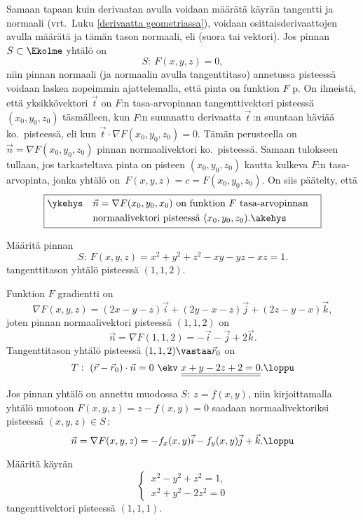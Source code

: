 Samaan tapaan kuin derivaatan avulla voidaan määrätä käyrän tangentti ja normaali 
(vrt.\ Luku \ref{derivaatta geometriassa}), voidaan osittaisderivaattojen avulla määrätä 
 ja tämän tason normaali, eli 
(suora tai vektori). Jos pinnan $S\subset\Ekolme$ yhtälö on 
\[ 
S: \ F(x,y,z)=0, 
\]
niin pinnan normaali (ja normaalin avulla tangenttitaso) annetussa pisteessä voidaan laskea 
nopeimmin ajattelemalla, että pinta on funktion $F$ p. On ilmeistä,
että yksikkövektori $\vec t$ on $F$:n tasa-arvopinnan tangenttivektori pisteessä
$(x_0,y_0,z_0)$ täsmälleen, kun $F$:n suunnattu derivaatta $\vec t\,$:n suuntaan häviää ko.\
pisteessä, eli kun $\vec t \cdot \nabla F(x_0,y_0,z_0)=0$. Tämän perusteella on
$\vec n = \nabla F(x_0,y_0,z_0)$ pinnan normaalivektori ko.\ pisteessä. Samaan tulokseen
tullaan, jos tarkasteltava pinta on pisteen $(x_0,y_0,z_0)$ kautta kulkeva $F$:n
tasa-arvopinta, jonka yhtälö on $\,F(x,y,z) = c = F(x_0,y_0,z_0)$. On siis päätelty, että
\[ \boxed{ \begin{aligned}
           \ykehys\quad &\vec n = \nabla F(x_0,y_0,x_0)\ 
                            \text{on funktion}\ F\ \text{tasa-arvopinnan} \quad \\
                        &\text{normaalivektori pisteessä}\ (x_0,y_0,z_0). \akehys
           \end{aligned} } 
\]
\begin{Exa} Määritä pinnan
\[ 
S:\ F(x,y,z) = x^2+y^2+z^2-xy-yz-xz = 1. 
\]
tangenttitason yhtälö pisteessä $(1,1,2)$.
\end{Exa}
\ratk Funktion $F$ gradientti on
\[ 
\nabla F(x,y,z) = (2x-y-z)\vec i + (2y-x-z)\vec j + (2z-y-x)\vec k, 
\]
joten pinnan normaalivektori pisteessä $(1,1,2)$ on
\[ 
\vec n = \nabla F(1,1,2) = -\vec i - \vec j + 2\vec k. 
\]
Tangenttitason yhtälö pisteessä $(1,1,2)\vastaa\vec r_0$ on
\[
T:\ (\vec r-\vec r_0)\cdot\vec n = 0\ \ekv\ \underline{\underline{x+y-2z+2=0}}. \loppu
\]
\begin{Exa} \label{udif-3: pintaesim} Jos pinnan yhtälö on annettu muodossa $S:\ z=f(x,y)$,
niin kirjoittamalla yhtälö muotoon $F(x,y,z)=z-f(x,y)=0$ saadaan normaalivektoriksi pisteessä
$(x,y,z) \in S\,$:
\[
\vec n = \nabla F(x,y,z) = -f_x(x,y)\vec i-f_y(x,y)\vec j+\vec k. \loppu
\]
\end{Exa}
\begin{Exa} Määritä käyrän
\[
\begin{cases} \,x^2-y^2+z^2=1, \\ \,x^2+y^2-2z^2=0 \end{cases}
\]
tangenttivektori pisteessä $(1,1,1)$. \end{Exa}
